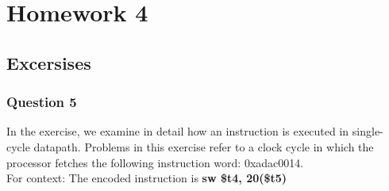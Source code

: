 \documentclass[11pt]{article}
\begin{document}
\section{Homework 4}


\setcounter{section}{12}
\setcounter{subsection}{13}
\subsection{Excersises}

\setcounter{subsubsection}{4}
\subsubsection{Question 5}
In the exercise, we examine in detail how an instruction is executed in single-cycle datapath. Problems in this exercise refer to a clock cycle in which the processor fetches the following instruction word: 0xadac0014.\\
For context: The encoded instruction is \textbf{sw \$t4, 20(\$t5)}
\end{document}
